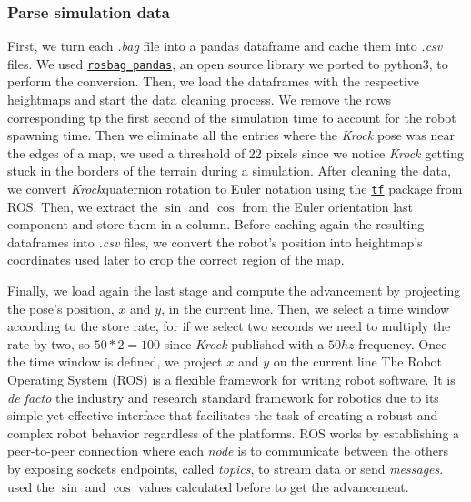 \documentclass[../document.tex]{subfiles}
\begin{document}
\subsubsection{Parse simulation data}
First, we turn each \emph{.bag} file into a pandas dataframe and cache them into \emph{.csv} files. We used \href{https://github.com/aktaylor08/RosbagPandas}{\texttt{rosbag\_pandas}}, an open source library we ported to python3, to perform the conversion.
Then, we load the dataframes with the respective heightmaps and start the data cleaning process. We remove the rows corresponding tp the first second of the simulation time to account for the robot spawning time. Then we eliminate all the entries where the \emph{Krock} pose was near the edges of a map, we used a threshold of $22$ pixels since we notice  \emph{Krock} getting stuck in the borders of the terrain during a simulation. 
After cleaning the data, we convert \emph{Krock}quaternion rotation to Euler notation using the \href{https://duckduckgo.com/?q=ros+tf&atb=v154-1__&ia=web}{\texttt{tf}} package from ROS. Then, we extract the $\sin$ and $\cos$ from the Euler orientation last component and store them in a column.
Before caching again the resulting dataframes into \emph{.csv} files, we convert the robot's position into heightmap's coordinates used later to crop the correct region of the map.

Finally, we load again the last stage and compute the advancement by projecting the pose's position, $x$ and $y$, in the current line. Then, we select a time window according to the store rate, for if we select two seconds we need to multiply the rate by two, so $50*2=100$ since \emph{Krock} published with a $50hz$ frequency. Once the time window is defined, we project $x$ and $y$ on the current line The Robot Operating System (ROS) \cite{ROS} is a flexible framework for writing robot software. It is \emph{de facto} the industry and research standard framework for robotics due to its simple yet effective interface that facilitates the task of creating a robust and complex robot behavior regardless of the platforms. ROS works by establishing a peer-to-peer connection where each \emph{node} is to communicate between the others by exposing sockets endpoints, called \emph{topics}, to stream data or send \emph{messages}. used the $\sin$ and $\cos$ values calculated before to get the advancement.
\end{document}
